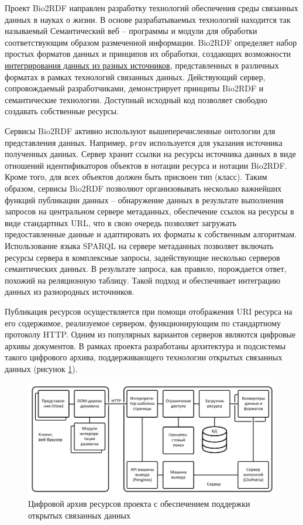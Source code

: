 \documentclass[a4paper,12pt,openany,final]{extreport}
\def\oldcaption{} \let\oldcaption=\caption
\def\caption{\stepcounter{captionsnum}\oldcaption}
\begin{document}
Проект Bio2RDF направлен разработку технологий обеспечения среды связанных данных в науках о жизни. В основе разрабатываемых технологий находится так называемый Семантический веб -- программы и модули для обработки соответствующим образом размеченной информации. Bio2RDF определяет набор простых форматов данных и принципов их обработки, создающих возможности \href{https://docs.google.com/presentation/d/1SG6PFew2CPK1o_jRCYx30DFnuGEEr0uWVKPnz7Uqw5k/pub?start=false\&loop=false\&delayms=3000\&slide=id.p}{интегрирования данных из разных источников}, представленных в различных форматах в рамках технологий связанных данных. Действующий сервер, сопровождаемый разработчиками, демонстрирует принципы Bio2RDF и семантические технологии. Доступный исходный код позволяет свободно создавать собственные ресурсы.

Сервисы Bio2RDF активно используют вышеперечисленные онтологии для представления данных. Например, \texttt{prov} используется для указания источника полученных данных. Сервер хранит ссылки на ресурсы источника данных в виде отношений идентификаторов объектов в нотации ресурса и нотации Bio2RDF. Кроме того, для всех объектов должен быть присвоен тип (класс).  Таким образом, сервисы Bio2RDF позволяют организовывать несколько важнейших функций публикации данных -- обнаружение данных в результате выполнения запросов на центральном сервере метаданных, обеспечение ссылок на ресурсы в виде стандартных URL, что в свою очередь позволяет загружать предоставленные данные и адаптировать их форматы к собственным алгоритмам. Использование языка SPARQL на сервере метаданных позволяет включать ресурсы сервера в комплексные запросы, задействующие несколько серверов семантических данных. В результате запроса, как правило, порождается ответ, похожий на реляционную таблицу. Такой подход и обеспечивает интеграцию данных из разнородных источников.

Публикация ресурсов осуществляется при помощи отображения URI ресурса на его содержимое, реализуемое сервером, функционирующим по стандартному протоколу HTTP.  Одним из популярных вариантов серверов являются цифровые архивы документов. В рамках проекта разработаны архитектура и подсистемы такого цифрового архива, поддерживающего технологии открытых связанных данных (рисунок \href{file://///home/eugeneai/Development/text/Projects/Lin"=2017/report"=2017/annotation.html\#fig:architecture"=LOD}{1}).

\begin{figure}\centering
\includegraphics[width=0.8\linewidth]{media/image18.png}

\caption{Цифровой архив ресурсов проекта с обеспечением поддержки открытых связанных данных}
\end{figure}
\end{document}
